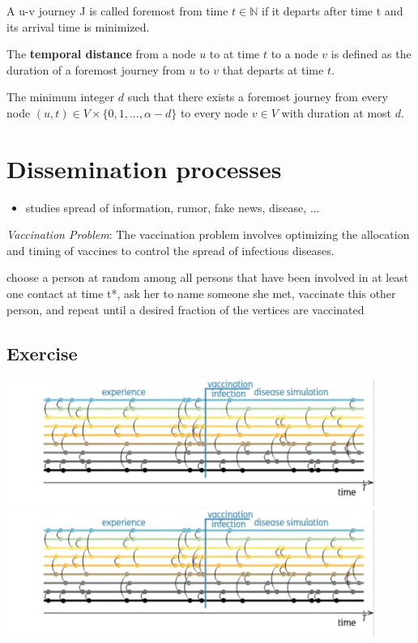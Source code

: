 \documentclass[11pt,a4paper]{article}
\begin{document}
\begin{tcolorbox}[title=Definition: Foremost Journey]
  A u-v journey J is called foremost from time $t \in \mathbb{N}$ if it departs after time t and its arrival time is minimized.
\end{tcolorbox}

\begin{tcolorbox}[title=Definition: Temporal distance]
  The \textbf{temporal distance} from a node $u$ to at time $t$ to a node $v$ is defined as the duration of a foremost journey from $u$ to $v$ that departs at time $t$.
\end{tcolorbox}
\begin{tcolorbox}[title=Definition: Temporal diameter $d$]
  The minimum integer $d$ such that there exists a foremost journey from every node $(u, t) \in V \times \{ 0, 1, ..., \alpha - d \}$  to every node $v \in V$ with duration at most $d$.
\end{tcolorbox}

\section{Dissemination processes}
\begin{itemize}
  \item studies spread of information, rumor, fake news, disease, ...
\end{itemize}
\bold\textit{{Vaccination Problem}}: The vaccination problem involves optimizing the allocation and timing of vaccines to control the spread of infectious diseases.\\
\begin{tcolorbox}[title=Neighbourhood Vacination protocol]
    choose a person at random among all persons that have been involved in at least one contact at time t*, ask her to name someone she met, vaccinate this other person, and repeat until a desired fraction of the vertices are vaccinated
\end{tcolorbox}
\subsection{Exercise}
\includegraphics[width=0.9\textwidth]{media/infection_process_a.png}\\
\includegraphics[width=0.9\textwidth]{media/infection_process_a.png}


\newpage

\end{document}
